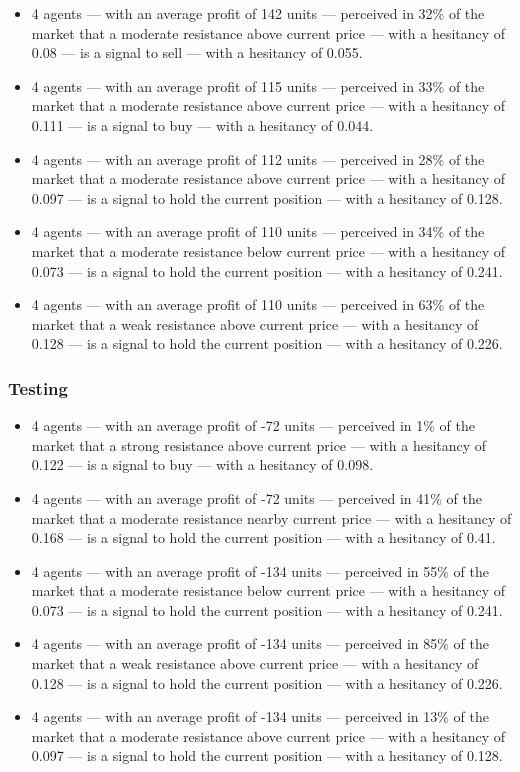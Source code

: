 {\small
  \begin{itemize}
  \item 4 agents — with an average profit of 142 units — perceived in 32\% of the market that a moderate resistance above current price — with a hesitancy of 0.08 — is a signal to sell — with a hesitancy of 0.055.
  \item 4 agents — with an average profit of 115 units — perceived in 33\% of the market that a moderate resistance above current price — with a hesitancy of 0.111 — is a signal to buy — with a hesitancy of 0.044.
  \item 4 agents — with an average profit of 112 units — perceived in 28\% of the market that a moderate resistance above current price — with a hesitancy of 0.097 — is a signal to hold the current position — with a hesitancy of 0.128.
  \item 4 agents — with an average profit of 110 units — perceived in 34\% of the market that a moderate resistance below current price — with a hesitancy of 0.073 — is a signal to hold the current position — with a hesitancy of 0.241.
  \item 4 agents — with an average profit of 110 units — perceived in 63\% of the market that a weak resistance above current price — with a hesitancy of 0.128 — is a signal to hold the current position — with a hesitancy of 0.226.
  \end{itemize}
}

\subsubsection{Testing}

{\small
  \begin{itemize}
  \item 4 agents — with an average profit of -72 units — perceived in 1\% of the market that a strong resistance above current price — with a hesitancy of 0.122 — is a signal to buy — with a hesitancy of 0.098.
  \item 4 agents — with an average profit of -72 units — perceived in 41\% of the market that a moderate resistance nearby current price — with a hesitancy of 0.168 — is a signal to hold the current position — with a hesitancy of 0.41.
  \item 4 agents — with an average profit of -134 units — perceived in 55\% of the market that a moderate resistance below current price — with a hesitancy of 0.073 — is a signal to hold the current position — with a hesitancy of 0.241.
  \item 4 agents — with an average profit of -134 units — perceived in 85\% of the market that a weak resistance above current price — with a hesitancy of 0.128 — is a signal to hold the current position — with a hesitancy of 0.226.
  \item 4 agents — with an average profit of -134 units — perceived in 13\% of the market that a moderate resistance above current price — with a hesitancy of 0.097 — is a signal to hold the current position — with a hesitancy of 0.128.
  \end{itemize}
}

